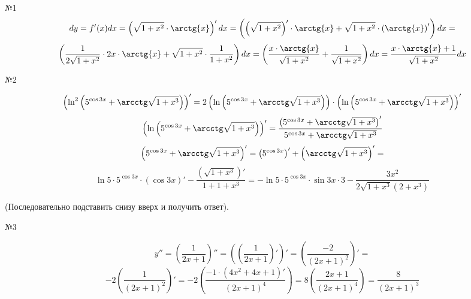 \documentclass[a4paper,14pt]{article}
\begin{document}

№1
\[
dy=f'(x)dx=
\left(\sqrt{1+x^2} \cdot \arctg{x}\right)'dx=
\left(\left(\sqrt{1+x^2}\right)' \cdot \arctg{x} + \sqrt{1+x^2} \cdot \left(\arctg{x}\right)'\right)dx=
\]\[
\left(\frac{1}{2\sqrt{1+x^2}}\cdot 2x  \cdot \arctg{x} + \sqrt{1+x^2} \cdot \frac{1}{1+x^2}\right)dx=
\left(\frac{x \cdot \arctg{x}}{\sqrt{1+x^2}} + \frac{1}{\sqrt{1+x^2}}\right)dx=
\frac{x \cdot \arctg{x} +1 }{\sqrt{1+x^2}}dx
\]

№2

\[
\left( \ln^2{\left( 5^{\cos 3x} + \arcctg \sqrt{1+x^3}  \right)} \right)'=
2 \left(\ln\left(5^{\cos 3x}+\arcctg \sqrt{1+x^3}\right)\right) \cdot \left(\ln{\left( 5^{\cos 3x} + \arcctg \sqrt{1+x^3}  \right)} \right)'
\]\[
\left(\ln{\left( 5^{\cos 3x} + \arcctg \sqrt{1+x^3}  \right)} \right)'=
\frac{\left(  5^{\cos 3x} + \arcctg \sqrt{1+x^3}  \right)'}{ 5^{\cos 3x} + \arcctg \sqrt{1+x^3} }
\]\[
\left( 5^{\cos 3x} + \arcctg \sqrt{1+x^3}  \right)'=
\left( 5^{\cos 3x}\right)' + \left(\arcctg \sqrt{1+x^3}\right)'=
\]\[
\ln 5 \cdot 5^{\cos 3x} \cdot (\cos 3x)' - \frac{\left(\sqrt{1+x^3}\right)'}{1+1+x^3}=
- \ln 5 \cdot 5^{\cos 3x} \cdot \sin 3x \cdot 3 - \frac{3x^2}{2\sqrt{1+x^3}\left( 2+x^3 \right)}
\]

(Последовательно подставить снизу вверх и получить ответ).

№3

\[
y''=
\left( \frac{1}{2x+1}\right)''=
\left(\left( \frac{1}{2x+1}\right)'\right)'=
\left( \frac{-2}{(2x+1)^2}\right)'=
\]\[
-2\left( \frac{1}{(2x+1)^2}\right)'=
-2\left( \frac{-1 \cdot (4x^2+4x+1)'}{(2x+1)^4}\right)=
8\left( \frac{2x+1}{(2x+1)^4}\right)=
\frac{8}{(2x+1)^3}
\]
\end{document}
